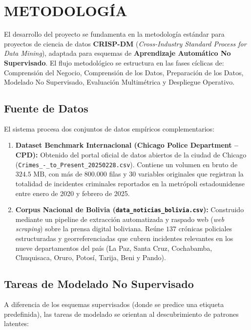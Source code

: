 \section{METODOLOGÍA}

El desarrollo del proyecto se fundamenta en la metodología estándar para proyectos de ciencia de datos \textbf{CRISP-DM} (\textit{Cross-Industry Standard Process for Data Mining}), adaptada para esquemas de \textbf{Aprendizaje Automático No Supervisado}. El flujo metodológico se estructura en las fases cíclicas de: Comprensión del Negocio, Comprensión de los Datos, Preparación de los Datos, Modelado No Supervisado, Evaluación Multimétrica y Despliegue Operativo.

\subsection{Fuente de Datos}

El sistema procesa dos conjuntos de datos empíricos complementarios:

\begin{enumerate}
    \item \textbf{Dataset Benchmark Internacional (Chicago Police Department -- CPD):} Obtenido del portal oficial de datos abiertos de la ciudad de Chicago (\texttt{Crimes\allowbreak\_-\allowbreak\_to\allowbreak\_Present\allowbreak\_20250228.csv}). Contiene un volumen en bruto de $324.5\text{ MB}$, con más de $800.000$ filas y $30$ variables originales que registran la totalidad de incidentes criminales reportados en la metrópoli estadounidense entre enero de 2020 y febrero de 2025.
    \item \textbf{Corpus Nacional de Bolivia (\texttt{data\_noticias\_bolivia.csv}):} Construido mediante un pipeline de extracción automatizada y raspado web (\textit{web scraping}) sobre la prensa digital boliviana. Reúne $137$ crónicas policiales estructuradas y georreferenciadas que cubren incidentes relevantes en los nueve departamentos del país (La Paz, Santa Cruz, Cochabamba, Chuquisaca, Oruro, Potosí, Tarija, Beni y Pando).
\end{enumerate}

\subsection{Tareas de Modelado No Supervisado}

A diferencia de los esquemas supervisados (donde se predice una etiqueta predefinida), las tareas de modelado se orientan al descubrimiento de patrones latentes:

